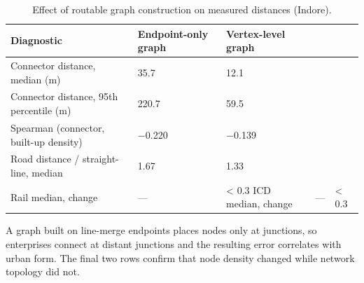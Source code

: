 \begin{table}[htbp]
\centering
\small
\caption{Effect of routable graph construction on measured distances (Indore).}
\label{tab:t3_graph}
\begin{tabular}{lll}
\toprule
Diagnostic & Endpoint-only graph & Vertex-level graph \\
\midrule
Connector distance, median (m) & 35.7 & 12.1 \\
Connector distance, 95th percentile (m) & 220.7 & 59.5 \\
Spearman (connector, built-up density) & −0.220 & −0.139 \\
Road distance / straight-line, median & 1.67 & 1.33 \\
Rail median, change & — & < 0.3%
ICD median, change & — & < 0.3%
\bottomrule
\end{tabular}
\begin{tablenotes}\footnotesize
\item A graph built on line-merge endpoints places nodes only at junctions, so enterprises connect at distant junctions and the resulting error correlates with urban form. The final two rows confirm that node density changed while network topology did not.
\end{tablenotes}
\end{table}
